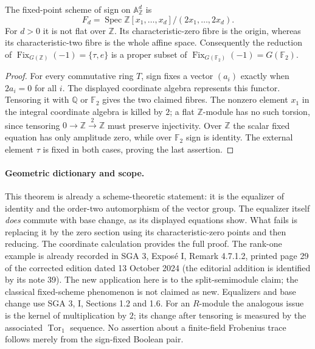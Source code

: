 \begin{theorem}[NN-S002]
The fixed-point scheme of sign on $\mathbb A^d_{\mathbb Z}$ is
\[
 F_d=\operatorname{Spec}\mathbb Z[x_1,\ldots,x_d]/(2x_1,\ldots,2x_d).
\]
For $d>0$ it is not flat over $\mathbb Z$. Its characteristic-zero
fibre is the origin, whereas its characteristic-two fibre is the
whole affine space. Consequently the reduction of
$\operatorname{Fix}_{G(\mathbb Z)}(-1)=\{\tau,e\}$ is a proper subset
of $\operatorname{Fix}_{G(\mathbb F_2)}(-1)=G(\mathbb F_2)$.
\end{theorem}

\begin{proof}
For every commutative ring $T$, sign fixes a vector $(a_i)$ exactly
when $2a_i=0$ for all $i$. The displayed coordinate algebra represents
this functor. Tensoring it with $\mathbb Q$ or $\mathbb F_2$ gives
the two claimed fibres. The nonzero element $x_1$ in the integral
coordinate algebra is killed by $2$; a flat $\mathbb Z$-module has
no such torsion, since tensoring $0\to\mathbb Z\xrightarrow{2}\mathbb Z$
must preserve injectivity. Over $\mathbb Z$ the scalar fixed equation
has only amplitude zero, while over $\mathbb F_2$ sign is identity.
The external element $\tau$ is fixed in both cases, proving the
last assertion.
\end{proof}

\paragraph{Geometric dictionary and scope.}
This theorem is already a scheme-theoretic statement: it is the
equalizer of identity and the order-two automorphism of the vector
group. The equalizer itself \emph{does} commute with base change,
as its displayed equations show. What fails is replacing it by the
zero section using its characteristic-zero points and then reducing.
The coordinate calculation provides the full proof. The rank-one
example is already recorded in SGA 3, Expos\'e I, Remark 4.7.1.2,
printed page 29 of the corrected edition dated 13 October 2024
(the editorial addition is identified by its note 39). The new
application here is to the split-semimodule claim; the classical
fixed-scheme phenomenon is not claimed as new. Equalizers and base
change use SGA 3, I, Sections 1.2 and 1.6.
For an $R$-module the analogous issue is the kernel of multiplication
by $2$; its change after tensoring is measured by the associated
$\operatorname{Tor}_1$ sequence. No assertion about a finite-field
Frobenius trace follows merely from the sign-fixed Boolean pair.



